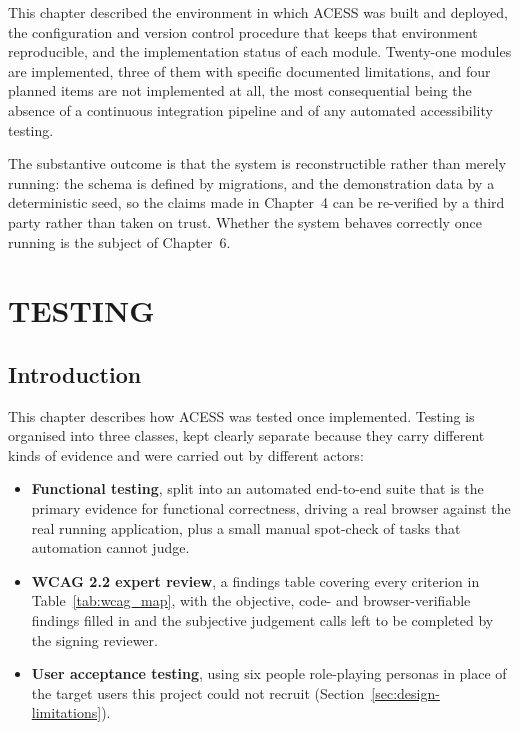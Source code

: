 \documentclass[12pt, oneside]{article} %
\begin{document}
This chapter described the environment in which ACESS was built and deployed, the configuration and version control procedure that keeps that environment reproducible, and the implementation status of each module. Twenty-one modules are implemented, three of them with specific documented limitations, and four planned items are not implemented at all, the most consequential being the absence of a continuous integration pipeline and of any automated accessibility testing.

The substantive outcome is that the system is reconstructible rather than merely running: the schema is defined by migrations, and the demonstration data by a deterministic seed, so the claims made in Chapter~4 can be re-verified by a third party rather than taken on trust. Whether the system behaves correctly once running is the subject of Chapter~6.

\newpage
\section{TESTING}
\label{sec:testing}

\subsection{Introduction}

This chapter describes how ACESS was tested once implemented. Testing is organised into three classes, kept clearly separate because they carry different kinds of evidence and were carried out by different actors:

\begin{itemize}
    \item \textbf{Functional testing}, split into an automated end-to-end suite that is the primary evidence for functional correctness, driving a real browser against the real running application, plus a small manual spot-check of tasks that automation cannot judge.
    \item \textbf{WCAG 2.2 expert review}, a findings table covering every criterion in Table~\ref{tab:wcag_map}, with the objective, code- and browser-verifiable findings filled in and the subjective judgement calls left to be completed by the signing reviewer.
    \item \textbf{User acceptance testing}, using six people role-playing personas in place of the target users this project could not recruit (Section~\ref{sec:design-limitations}).
\end{itemize}
\end{document}
